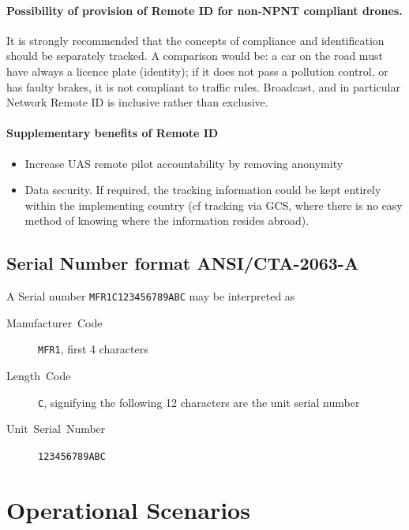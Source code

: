 \documentclass{ua_wgs_base}
\begin{document}
\paragraph{Possibility of provision of Remote ID for non-NPNT compliant drones.}

It is strongly recommended that the concepts of compliance and identification
should be separately tracked. A comparison would be: a car on the
road must have always a licence plate (identity); if it does not pass
a pollution control, or has faulty brakes, it is not compliant to
traffic rules. Broadcast, and in particular Network Remote ID is inclusive
rather than exclusive. 


\paragraph{Supplementary benefits of Remote ID}
\begin{itemize}
\item Increase UAS remote pilot accountability by removing anonymity
\item Data security. If required, the tracking information could be kept
entirely within the implementing country (cf tracking via GCS, where
there is no easy method of knowing where the information resides abroad).
\end{itemize}


\subsection{Serial Number format ANSI/CTA-2063-A\label{subsec:ANSI-CTA-2063-A}}

A Serial number \texttt{MFR1C123456789ABC} may be interpreted as 
\begin{description}
\item [{Manufacturer~Code}] \texttt{MFR1}, first 4 characters
\item [{Length~Code}] \texttt{C}, signifying the following 12 characters
are the unit serial number
\item [{Unit~Serial~Number}] \texttt{123456789ABC}
\end{description}

\section{Operational Scenarios}
\end{document}
